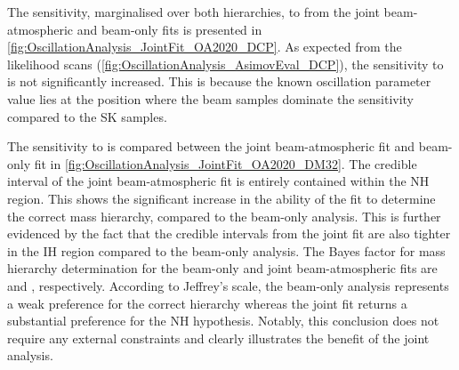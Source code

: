 The sensitivity, marginalised over both hierarchies, to  from the joint beam-atmospheric and beam-only fits is presented in \autoref{fig:OscillationAnalysis_JointFit_OA2020_DCP}. As expected from the likelihood scans (\autoref{fig:OscillationAnalysis_AsimovEval_DCP}), the sensitivity to  is not significantly increased. This is because the known oscillation parameter value lies at the position where the beam samples dominate the sensitivity compared to the SK samples.

The sensitivity to  is compared between the joint beam-atmospheric fit and beam-only fit in \autoref{fig:OscillationAnalysis_JointFit_OA2020_DM32}. The \quickmath{1\sigma} credible interval of the joint beam-atmospheric fit is entirely contained within the NH region. This shows the significant increase in the ability of the fit to determine the correct mass hierarchy, compared to the beam-only analysis. This is further evidenced by the fact that the  credible intervals from the joint fit are also tighter in the IH region compared to the beam-only analysis. The Bayes factor for mass hierarchy determination for the beam-only and joint beam-atmospheric fits are  and , respectively. According to Jeffrey's scale, the beam-only analysis represents a weak preference for the correct hierarchy whereas the joint fit returns a substantial preference for the NH hypothesis. Notably, this conclusion does not require any external constraints and clearly illustrates the benefit of the joint analysis.

